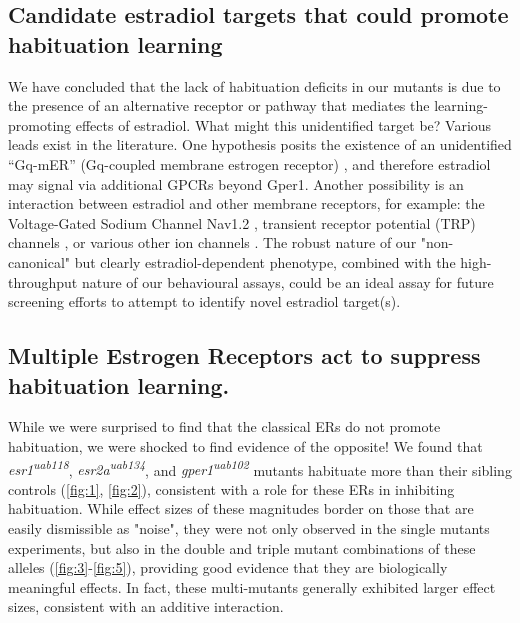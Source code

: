 \documentclass[9.5pt,lineno]{RandlettLab_elife}
\begin{document}
{\subsection{Candidate estradiol targets that could promote habituation learning}

We have concluded that the lack of habituation deficits in our mutants is due to the presence of an alternative receptor or pathway that mediates the learning-promoting effects of estradiol.
What might this unidentified target be? 
Various leads exist in the literature. 
One hypothesis posits the existence of an unidentified “Gq-mER” (Gq-coupled membrane estrogen receptor) \citep{Qiu2006-ml, Vail2019-lx}, and therefore estradiol may signal via additional GPCRs beyond Gper1. 
Another possibility is an interaction between estradiol and other membrane receptors, for example: the Voltage-Gated Sodium Channel Nav1.2 \citep{Sula2021-vs, Trevino2021-wl}, transient receptor potential (TRP) channels \citep{Payrits2017-cd, Ramirez-Barrantes2020-iv}, or various other ion channels \citep{Kow2016-dl}.
The robust nature of our "non-canonical" but clearly estradiol-dependent phenotype, combined with the high-throughput nature of our behavioural assays, could be an ideal assay for future screening efforts to attempt to identify novel estradiol target(s). 

\subsection{Multiple Estrogen Receptors act to suppress habituation learning.}
 
While we were surprised to find that the classical ERs do not promote habituation, we were shocked to find evidence of the opposite!
We found that \emph{esr1\textsuperscript{uab118}}, \emph{esr2a\textsuperscript{uab134}},  and \emph{gper1\textsuperscript{uab102}} mutants habituate more than their sibling controls (\autoref{fig:1}, \autoref{fig:2}), consistent with a role for these ERs in inhibiting habituation.
While effect sizes of these magnitudes border on those that are easily dismissible as "noise", they were not only observed in the single mutants experiments, but also in the double and triple mutant combinations of these alleles (\autoref{fig:3}-\autoref{fig:5}), providing good evidence that they are biologically meaningful effects. 
In fact, these multi-mutants generally exhibited larger effect sizes, consistent with an additive interaction. 
 
}
\end{document}
